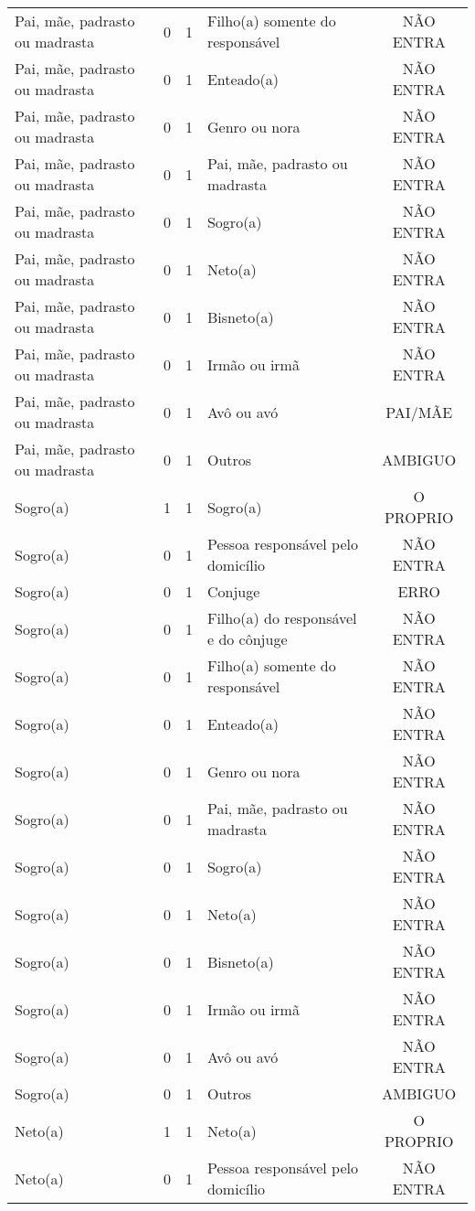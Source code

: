 \documentclass[
	12pt,				%
	openright,			%
	twoside,			%
	a4paper,			%
	english,			%
	french,				%
	spanish,			%
	brazil				%
	]{abntex2}
\begin{document}
\begin{anexosenv}
\begin{longtable}{@{}lcclc@{}}
				Pai, mãe, padrasto ou madrasta & 0 & 1 & Filho(a) somente do responsável & NÃO ENTRA \\
				Pai, mãe, padrasto ou madrasta & 0 & 1 & Enteado(a) & NÃO ENTRA \\
				Pai, mãe, padrasto ou madrasta & 0 & 1 & Genro ou nora & NÃO ENTRA \\
				Pai, mãe, padrasto ou madrasta & 0 & 1 & Pai, mãe, padrasto ou madrasta & NÃO ENTRA \\
				Pai, mãe, padrasto ou madrasta & 0 & 1 & Sogro(a) & NÃO ENTRA \\
				Pai, mãe, padrasto ou madrasta & 0 & 1 & Neto(a) & NÃO ENTRA \\
				Pai, mãe, padrasto ou madrasta & 0 & 1 & Bisneto(a) & NÃO ENTRA \\
				Pai, mãe, padrasto ou madrasta & 0 & 1 & Irmão ou irmã & NÃO ENTRA \\
				Pai, mãe, padrasto ou madrasta & 0 & 1 & Avô ou avó & PAI/MÃE \\
				Pai, mãe, padrasto ou madrasta & 0 & 1 & Outros & AMBIGUO \\
				Sogro(a) & 1 & 1 & Sogro(a) & O PROPRIO \\
				Sogro(a) & 0 & 1 & Pessoa responsável pelo domicílio & NÃO ENTRA \\
				Sogro(a) & 0 & 1 & Conjuge & ERRO \\
				Sogro(a) & 0 & 1 & Filho(a) do responsável e do cônjuge & NÃO ENTRA \\
				Sogro(a) & 0 & 1 & Filho(a) somente do responsável & NÃO ENTRA \\
				Sogro(a) & 0 & 1 & Enteado(a) & NÃO ENTRA \\
				Sogro(a) & 0 & 1 & Genro ou nora & NÃO ENTRA \\
				Sogro(a) & 0 & 1 & Pai, mãe, padrasto ou madrasta & NÃO ENTRA \\
				Sogro(a) & 0 & 1 & Sogro(a) & NÃO ENTRA \\
				Sogro(a) & 0 & 1 & Neto(a) & NÃO ENTRA \\
				Sogro(a) & 0 & 1 & Bisneto(a) & NÃO ENTRA \\
				Sogro(a) & 0 & 1 & Irmão ou irmã & NÃO ENTRA \\
				Sogro(a) & 0 & 1 & Avô ou avó & NÃO ENTRA \\
				Sogro(a) & 0 & 1 & Outros & AMBIGUO \\
				Neto(a) & 1 & 1 & Neto(a) & O PROPRIO \\
				Neto(a) & 0 & 1 & Pessoa responsável pelo domicílio & NÃO ENTRA \\

\end{longtable}
\end{anexosenv}
\end{document}
